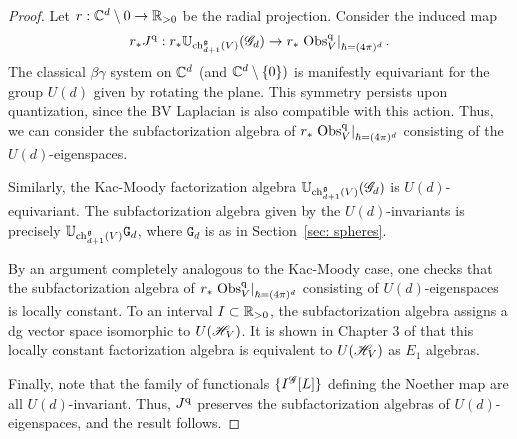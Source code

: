 \begin{proof}
Let $r : \mathbb C^d \setminus 0 \to \mathbb R_{>0}$ be the radial projection. 
Consider the induced map
\[
r_* J^{\rm q} :  r_* \mathbb U_{{\rm ch}_{d+1}^\mathfrak g(V)} (\mathscr G_d) \to  r_* \left. {\rm Obs}^{\rm q}_V \right|_{\hbar = (4\pi)^d}  .
\]
The classical $\beta\gamma$ system on $\mathbb C^d$ (and $\mathbb C^d \setminus \{0\})$ is manifestly equivariant for the group $U(d)$ given by rotating the plane. 
This symmetry persists upon quantization, since the BV Laplacian is also compatible with this action. 
Thus, we can consider the subfactorization algebra of $r_* \left. {\rm Obs}^{\rm q}_V \right|_{\hbar = (4\pi)^d}$ consisting of the $U(d)$-eigenspaces. 

Similarly, the Kac-Moody factorization algebra $\mathbb U_{{\rm ch}_{d+1}^\mathfrak g(V)} (\mathscr G_d)$ is $U(d)$-equivariant. 
The subfactorization algebra given by the $U(d)$-invariants is precisely $\mathbb U_{{\rm ch}_{d+1}^\mathfrak g(V)} \mathtt{G}_d$, where $\mathtt{G}_d$ is as in Section~\ref{sec: spheres}. 

By an argument completely analogous to the Kac-Moody case, one checks that the subfactorization algebra of $r_* \left. {\rm Obs}^{\rm q}_V \right|_{\hbar = (4\pi)^d}$ consisting of $U(d)$-eigenspaces is locally constant.
To an interval $I \subset \mathbb R_{>0}$, the subfactorization algebra assigns a dg vector space isomorphic to $U(\mathscr H_V)$. 
It is shown in Chapter 3 of \cite{BWthesis} that this locally constant factorization algebra is equivalent to $U(\mathscr H_V)$ as $E_1$ algebras. 

Finally, note that the family of functionals $\{I^{\mathscr G}[L]\}$ defining the Noether map are all $U(d)$-invariant.
Thus, $J^{\rm q}$ preserves the subfactorization algebras of $U(d)$-eigenspaces, and the result follows.
\end{proof}
